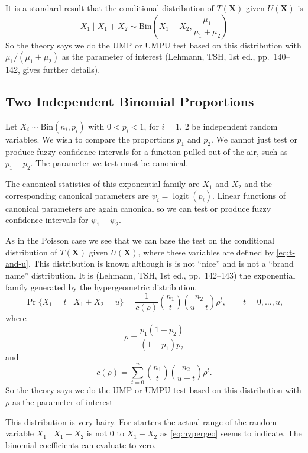 \documentclass{article}
\DeclareMathOperator{\pr}{Pr}
\DeclareMathOperator{\logit}{logit}
\newcommand{\BinomialDis}{\text{Bin}}
\begin{document}
It is a standard result that the conditional distribution of
$T(\mathbf{X})$ given $U(\mathbf{X})$ is
$$
   X_1 \mid X_1 + X_2
   \sim
   \BinomialDis\left(X_1 + X_2, \frac{\mu_1}{\mu_1 + \mu_2}\right)
$$
So the theory says we do the UMP or UMPU test based on this distribution
with $\mu_1 / (\mu_1 + \mu_2)$ as the parameter of interest
(Lehmann, TSH, 1st ed., pp.~140--142, gives further details).

\subsection{Two Independent Binomial Proportions} \label{sec:two-binom-indep}

Let $X_i \sim \BinomialDis(n_i, p_i)$ with $0 < p_i < 1$, for $i = 1$, $2$
be independent random variables.  We wish to compare the proportions $p_1$ and
$p_2$.  We cannot just test or produce fuzzy confidence intervals for
a function pulled out of the air, such as $p_1 - p_2$.  The parameter
we test must be canonical.

The canonical statistics of this exponential family are $X_1$ and $X_2$
and the corresponding canonical parameters are $\psi_i = \logit(p_i)$.
Linear functions of canonical parameters are again canonical so we can test
or produce fuzzy confidence intervals for $\psi_1 - \psi_2$.

As in the Poisson case we see that we can base the test on the conditional
distribution of $T(\mathbf{X})$ given $U(\mathbf{X})$, where these variables
are defined by \eqref{eq:t-and-u}.
This distribution is known although is is not ``nice'' and is
not a ``brand name'' distribution.
It is (Lehmann, TSH, 1st ed., pp.~142--143) the exponential family generated
by the hypergeometric distribution.
\begin{equation} \label{eq:hypergeo}
   \pr\{ X_1 = t \mid X_1 + X_2 = u \}
   =
   \frac{1}{c(\rho)} \binom{n_1}{t} \binom{n_2}{u - t} \rho^t,
   \qquad t = 0, \ldots, u,
\end{equation}
where
$$
   \rho = \frac{p_1 (1 - p_2)}{(1 - p_1) p_2}
$$
and
$$
   c(\rho)
   =
   \sum_{t = 0}^u \binom{n_1}{t} \binom{n_2}{u - t} \rho^t.
$$
So the theory says we do the UMP or UMPU test based on this distribution
with $\rho$ as the parameter of interest

This distribution is very hairy.  For starters the actual range of the
random variable $X_1 \mid X_1 + X_2$ is not 0 to $X_1 + X_2$ as
\eqref{eq:hypergeo} seems to indicate.  The binomial coefficients can
evaluate to zero.
\end{document}
